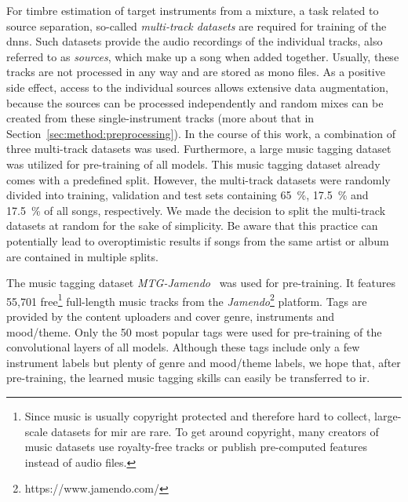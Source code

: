 For timbre estimation of target instruments from a mixture, a task related to source separation, so-called \textit{multi-track datasets} are required for training of the \glspl{dnn}. Such datasets provide the audio recordings of the individual tracks, also referred to as \textit{sources}, which make up a song when added together. Usually, these tracks are not processed in any way and are stored as mono files. As a positive side effect, access to the individual sources allows extensive data augmentation, because the sources can be processed independently and random mixes can be created from these single-instrument tracks (more about that in Section~\ref{sec:method:preprocessing}). In the course of this work, a combination of three multi-track datasets was used. Furthermore, a large music tagging dataset was utilized for pre-training of all models. This music tagging dataset already comes with a predefined split. However, the multi-track datasets were randomly divided into training, validation and test sets containing \SI{65}{\percent}, \SI{17.5}{\percent} and \SI{17.5}{\percent} of all songs, respectively. We made the decision to split the multi-track datasets at random for the sake of simplicity. Be aware that this practice can potentially lead to overoptimistic results if songs from the same artist or album are contained in multiple splits.

The music tagging dataset \textit{MTG-Jamendo}~\cite{bogdanov2019jamendo} was used for pre-training. It features 55,701 free\footnote{Since music is usually copyright protected and therefore hard to collect, large-scale datasets for \gls{mir} are rare. To get around copyright, many creators of music datasets use royalty-free tracks or publish pre-computed features instead of audio files.} full-length music tracks from the \textit{Jamendo}\footnote{https://www.jamendo.com/} platform. Tags are provided by the content uploaders and cover genre, instruments and mood/theme. Only the 50 most popular tags were used for pre-training of the convolutional layers of all models. Although these tags include only a few instrument labels but plenty of genre and mood/theme labels, we hope that, after pre-training, the learned music tagging skills can easily be transferred to \gls{ir}.\\

